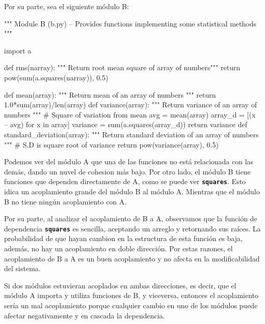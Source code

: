 Por su parte, sea el siguiente módulo B:

\begin{VerbatimBold}
    """ Module B (b.py) – Provides functions implementing some statistical
    methods """
    
    import a
    
    def rms(narray):
        """ Return root mean square of array of numbers"""
        return pow(sum(a.squares(narray)), 0.5)
    
    def mean(array):
        """ Return mean of an array of numbers """
        return 1.0*sum(array)/len(array)
    def variance(array):
        """ Return variance of an array of numbers """
        # Square of variation from mean
        avg = mean(array)
        array_d = [(x – avg) for x in array]
        variance = sum(a.squares(array_d))
        return variance
    def standard_deviation(array):
        """ Return standard deviation of an array of numbers """
        # S.D is square root of variance
        return pow(variance(array), 0.5)
\end{VerbatimBold}

Podemos ver del módulo A que una de las funciones no está relacionada con las demás, dando un nuvel de cohesion más bajo. Por otro lado, el módulo B tiene funciones que dependen directamente de A, como se puede ver \texttt{\textbf{squares}}. Esto idica un acoplamiento grande del módulo B al módulo A. Mientras que el módulo B no tiene ningún acoplamiento con A.

Por su parte, al analizar el acoplamiento de B a A, observamos que la función de dependencia \texttt{\textbf{squares}} es sencilla, aceptando un arreglo y retornando sus raíces. La probabilidad de que hayan cambion en la estructura de esta función es baja, además, no hay un acoplamiento en doble dirección. Por estas razones, el acoplamiento de B a A es un buen acoplamiento y no afecta en la modificabilidad del sistema.

Si dos módulos estuvieran acoplados en ambas direcciones, es decir, que el módulo A importa y utiliza funciones de B, y viceversa, entonces el acoplamiento sería un mal acoplamiento porque cualquier cambio en uno de los módulos puede afectar negativamente y en cascada la dependencia.
